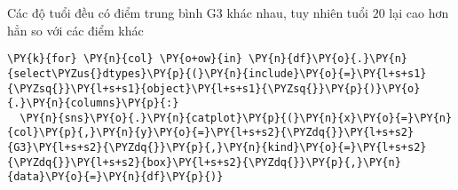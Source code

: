     Các độ tuổi đều có điểm trung bình G3 khác nhau, tuy nhiên tuổi \(20\)
lại cao hơn hẳn so với các điểm khác

    \begin{tcolorbox}[breakable, size=fbox, boxrule=1pt, pad at break*=1mm,colback=cellbackground, colframe=cellborder]
\begin{Verbatim}[commandchars=\\\{\}]
\PY{k}{for} \PY{n}{col} \PY{o+ow}{in} \PY{n}{df}\PY{o}{.}\PY{n}{select\PYZus{}dtypes}\PY{p}{(}\PY{n}{include}\PY{o}{=}\PY{l+s+s1}{\PYZsq{}}\PY{l+s+s1}{object}\PY{l+s+s1}{\PYZsq{}}\PY{p}{)}\PY{o}{.}\PY{n}{columns}\PY{p}{:}
  \PY{n}{sns}\PY{o}{.}\PY{n}{catplot}\PY{p}{(}\PY{n}{x}\PY{o}{=}\PY{n}{col}\PY{p}{,}\PY{n}{y}\PY{o}{=}\PY{l+s+s2}{\PYZdq{}}\PY{l+s+s2}{G3}\PY{l+s+s2}{\PYZdq{}}\PY{p}{,}\PY{n}{kind}\PY{o}{=}\PY{l+s+s2}{\PYZdq{}}\PY{l+s+s2}{box}\PY{l+s+s2}{\PYZdq{}}\PY{p}{,}\PY{n}{data}\PY{o}{=}\PY{n}{df}\PY{p}{)}
\end{Verbatim}
\end{tcolorbox}

    \begin{center}
    \end{center}
    { \hspace*{\fill} \\}
    
    \begin{center}
    \end{center}
    { \hspace*{\fill} \\}
    
    \begin{center}
    \end{center}
    { \hspace*{\fill} \\}
    
    \begin{center}
    \end{center}
    { \hspace*{\fill} \\}
    
